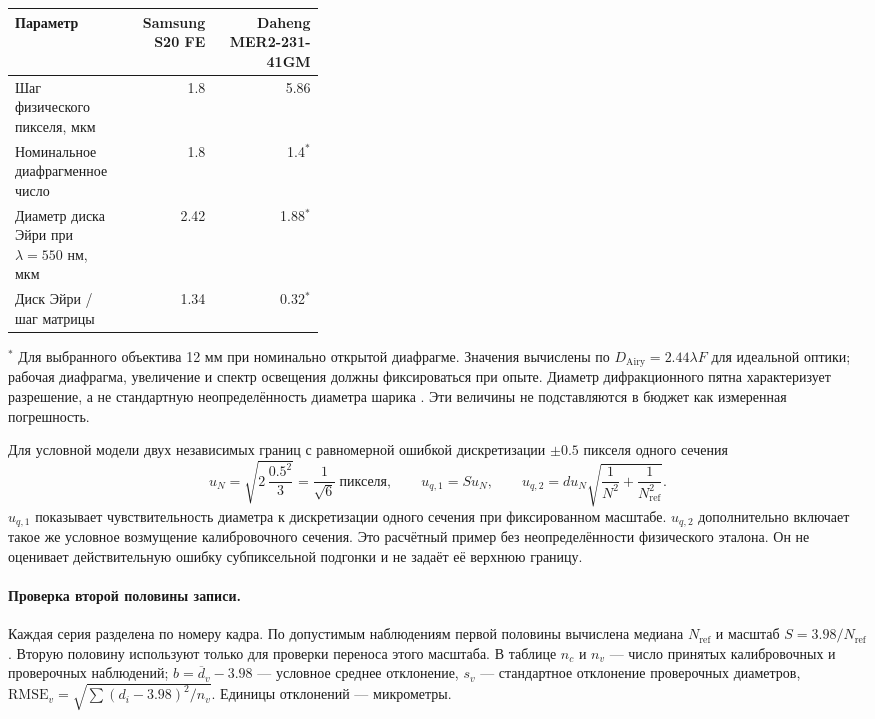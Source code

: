 \documentclass[12pt,a4paper]{article}
\begin{document}
\begin{center}\small
\begin{tabular}{p{0.36\linewidth}rr}
\toprule
Параметр & Samsung S20 FE & Daheng MER2-231-41GM \\
\midrule
Шаг физического пикселя, мкм & 1.8 & 5.86 \\
Номинальное диафрагменное число & 1.8 & 1.4$^{*}$ \\
Диаметр диска Эйри при $\lambda=550$ нм, мкм & 2.42 & 1.88$^{*}$ \\
Диск Эйри / шаг матрицы & 1.34 & 0.32$^{*}$ \\
\bottomrule
\end{tabular}\end{center}
$^{*}$ Для выбранного объектива 12 мм при номинально открытой диафрагме. Значения вычислены по $D_{\mathrm{Airy}}=2.44\lambda F$ для идеальной оптики; рабочая диафрагма, увеличение и спектр освещения должны фиксироваться при опыте. Диаметр дифракционного пятна характеризует разрешение, а не стандартную неопределённость диаметра шарика \cite{optics,samsung,daheng}. Эти величины не подставляются в бюджет как измеренная погрешность.

Для условной модели двух независимых границ с равномерной ошибкой дискретизации $\pm0.5$ пикселя одного сечения
\[
 u_N=\sqrt{2\,\frac{0.5^2}{3}}=\frac{1}{\sqrt6}\ \text{пикселя},\qquad
 u_{q,1}=S u_N,\qquad
 u_{q,2}=d u_N\sqrt{\frac{1}{N^2}+\frac{1}{N_{\mathrm{ref}}^2}}.
\]
$u_{q,1}$ показывает чувствительность диаметра к дискретизации одного сечения при фиксированном масштабе. $u_{q,2}$ дополнительно включает такое же условное возмущение калибровочного сечения. Это расчётный пример без неопределённости физического эталона. Он не оценивает действительную ошибку субпиксельной подгонки и не задаёт её верхнюю границу.

\paragraph{Проверка второй половины записи.}
Каждая серия разделена по номеру кадра. По допустимым наблюдениям первой половины вычислена медиана $N_{\mathrm{ref}}$ и масштаб $S=3.98/N_{\mathrm{ref}}$. Вторую половину используют только для проверки переноса этого масштаба. В таблице $n_c$ и $n_v$ --- число принятых калибровочных и проверочных наблюдений; $b=\overline d_v-3.98$ --- условное среднее отклонение, $s_v$ --- стандартное отклонение проверочных диаметров, $\mathrm{RMSE}_v=\sqrt{\sum(d_i-3.98)^2/n_v}$. Единицы отклонений --- микрометры.
\end{document}
